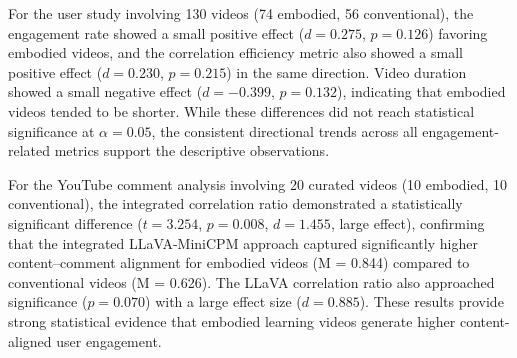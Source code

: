 \documentclass[12pt]{article}
\begin{document}
For the user study involving 130 videos (74 embodied, 56 conventional), the engagement rate showed a small positive effect ($d = 0.275$, $p = 0.126$) favoring embodied videos, and the correlation efficiency metric also showed a small positive effect ($d = 0.230$, $p = 0.215$) in the same direction. Video duration showed a small negative effect ($d = -0.399$, $p = 0.132$), indicating that embodied videos tended to be shorter. While these differences did not reach statistical significance at $\alpha = 0.05$, the consistent directional trends across all engagement-related metrics support the descriptive observations.

For the YouTube comment analysis involving 20 curated videos (10 embodied, 10 conventional), the integrated correlation ratio demonstrated a statistically significant difference ($t = 3.254$, $p = 0.008$, $d = 1.455$, large effect), confirming that the integrated LLaVA-MiniCPM approach captured significantly higher content--comment alignment for embodied videos (M = 0.844) compared to conventional videos (M = 0.626). The LLaVA correlation ratio also approached significance ($p = 0.070$) with a large effect size ($d = 0.885$). These results provide strong statistical evidence that embodied learning videos generate higher content-aligned user engagement.
\end{document}
